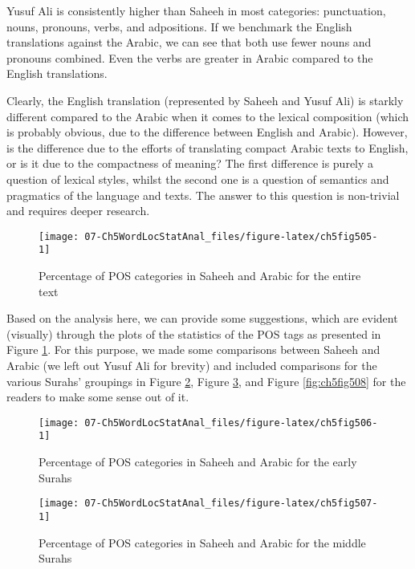\documentclass[
]{article}
\begin{document}
Yusuf Ali is consistently higher than Saheeh in most categories: punctuation, nouns, pronouns, verbs, and adpositions. If we benchmark the English translations against the Arabic, we can see that both use fewer nouns and pronouns combined. Even the verbs are greater in Arabic compared to the English translations.

Clearly, the English translation (represented by Saheeh and Yusuf Ali) is starkly different compared to the Arabic when it comes to the lexical composition (which is probably obvious, due to the difference between English and Arabic). However, is the difference due to the efforts of translating compact Arabic texts to English, or is it due to the compactness of meaning? The first difference is purely a question of lexical styles, whilst the second one is a question of semantics and pragmatics of the language and texts. The answer to this question is non-trivial and requires deeper research.

\begin{figure}

{\centering \texttt{[image: 07-Ch5WordLocStatAnal\_files/figure-latex/ch5fig505-1]} 

}

\caption{Percentage of POS categories in Saheeh and Arabic for the entire text}\label{fig:ch5fig505}
\end{figure}

Based on the analysis here, we can provide some suggestions, which are evident (visually) through the plots of the statistics of the POS tags as presented in Figure \ref{fig:ch5fig505}. For this purpose, we made some comparisons between Saheeh and Arabic (we left out Yusuf Ali for brevity) and included comparisons for the various Surahs' groupings in Figure \ref{fig:ch5fig506}, Figure \ref{fig:ch5fig507}, and Figure \ref{fig:ch5fig508} for the readers to make some sense out of it.

\begin{figure}

{\centering \texttt{[image: 07-Ch5WordLocStatAnal\_files/figure-latex/ch5fig506-1]} 

}

\caption{Percentage of POS categories in Saheeh and Arabic for the early Surahs}\label{fig:ch5fig506}
\end{figure}

\begin{figure}

{\centering \texttt{[image: 07-Ch5WordLocStatAnal\_files/figure-latex/ch5fig507-1]} 

}

\caption{Percentage of POS categories in Saheeh and Arabic for the middle Surahs}\label{fig:ch5fig507}
\end{figure}
\end{document}
